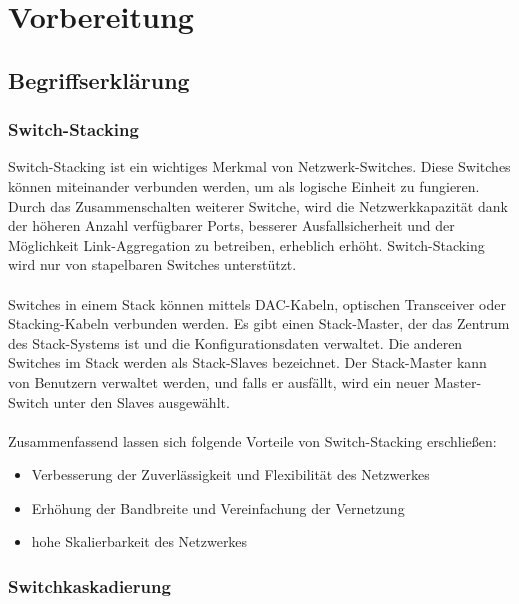 \newpage
\section{Vorbereitung}

    \subsection{Begriffserklärung}

        \subsubsection{Switch-Stacking}

        Switch-Stacking ist ein wichtiges Merkmal von Netzwerk-Switches.
        Diese Switches können miteinander verbunden werden, um als 
        logische Einheit zu fungieren. Durch das Zusammenschalten weiterer Switche, wird die Netzwerkkapazität 
        dank der höheren Anzahl verfügbarer Ports, besserer Ausfallsicherheit und der Möglichkeit 
        Link-Aggregation zu betreiben, erheblich erhöht. 
        Switch-Stacking wird nur von stapelbaren Switches unterstützt. \\\\
        Switches in einem Stack können mittels DAC-Kabeln, optischen Transceiver oder Stacking-Kabeln verbunden werden. 
        Es gibt einen Stack-Master, der das Zentrum des Stack-Systems ist und die Konfigurationsdaten verwaltet. 
        Die anderen Switches im Stack werden als Stack-Slaves bezeichnet. 
        Der Stack-Master kann von Benutzern verwaltet werden, und falls er ausfällt, wird ein neuer Master-Switch unter den Slaves ausgewählt.\\\\
        Zusammenfassend lassen sich folgende Vorteile von Switch-Stacking erschließen:
        \begin{itemize}
            \item Verbesserung der Zuverlässigkeit und Flexibilität des Netzwerkes
            \item Erhöhung der Bandbreite und Vereinfachung der Vernetzung
            \item hohe Skalierbarkeit des Netzwerkes
        \end{itemize}

        \subsubsection{Switchkaskadierung}


